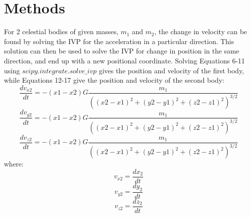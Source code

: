 \documentclass[10pt]{article}
\begin{document}
\section{Methods}\label{Sec_Methods}
For 2 celestial bodies of given masses, $m_1$ and $m_2$, the change in velocity can be found by solving the IVP for the acceleration in a particular direction. This solution can then be used to solve the IVP for change in position in the same direction, and end up with a new positional coordinate. Solving Equations 6-11 using $scipy.integrate.solve\_ivp$ gives the position and velocity of the first body, while Equations 12-17 give the position and velocity of the second body:
\begin{equation}
	\frac{dv_{x2}}{dt} = -(x1-x2)G \frac{m_1}{((x2-x1)^2 + (y2-y1)^2 + (z2-z1)^2)^{3/2}}
\end{equation}
\begin{equation}
	\frac{dv_{y2}}{dt} = -(x1-x2)G \frac{m_1}{((x2-x1)^2 + (y2-y1)^2 + (z2-z1)^2)^{3/2}}
\end{equation}
\begin{equation}
	\frac{dv_{z2}}{dt} = -(x1-x2)G \frac{m_1}{((x2-x1)^2 + (y2-y1)^2 + (z2-z1)^2)^{3/2}}
\end{equation}
where:
\begin{equation}
	v_{x2} = \frac{dx_{2}}{dt}
\end{equation}
\begin{equation}
	v_{y2} = \frac{dy_{2}}{dt}
\end{equation}
\begin{equation}
	v_{z2} = \frac{dz_{2}}{dt}
\end{equation}
\end{document}
